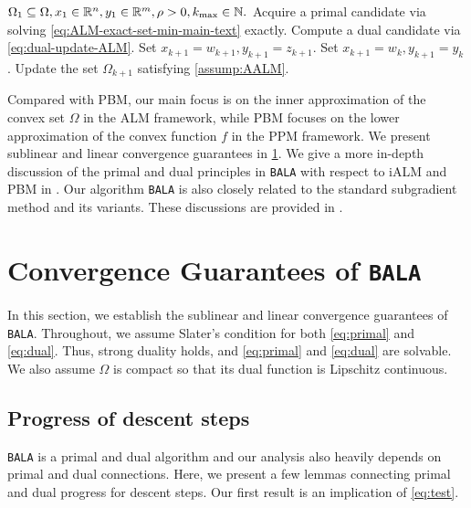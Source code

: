\documentclass[11pt]{article}
\newcommand{\alg}{\texttt{BALA}}%
\begin{document}
\begin{algorithm}[t]
\caption{\underline{B}undle-based \underline{A}ug. \underline{L}agrangian \underline{A}lg. (\alg)
}
\label{alg:bundle-dual}
\begin{algorithmic}[1]
\Require $\Omega_1 \subseteq \Omega, x_1 \in \mathbb{R}^n ,y_1 \in \mathbb{R}^m, \rho  > 0, k_{\max} \in \mathbb{N}.$
    \State Acquire a primal candidate via solving \cref{eq:ALM-exact-set-min-main-text} exactly. 
    \State Compute a dual candidate via \cref{eq:dual-update-ALM}. 
     \State Set $x_{k+1} = w_{k+1}, y_{k+1} = z_{k+1}$.  \hfill {}
    \Else
       \State Set $x_{k+1} = w_{k}, y_{k+1} = y_k$. \hfill  {}
    \EndIf
    \State Update the set $\Omega_{k+1}$ satisfying \cref{assump:AALM}.
\EndFor
\end{algorithmic}
\end{algorithm}
Compared with PBM, our main focus is on the inner approximation of the convex set $\Omega$ in the ALM framework, while PBM focuses on the lower approximation of the convex function $f$ in the PPM framework. 
We present sublinear and linear convergence guarantees in \cref{section:convergence}. We give a more in-depth discussion of the primal and dual principles in \alg{} with respect to iALM and PBM in . Our algorithm \alg{} is also closely related to the standard subgradient method and its variants. These discussions are provided in . 

\section{Convergence Guarantees of \alg} 
\label{section:convergence}
In this section, we establish the sublinear and linear convergence guarantees of \alg. Throughout, we assume Slater's condition for both \eqref{eq:primal} and \eqref{eq:dual}. Thus, strong duality holds, and \eqref{eq:primal} and \eqref{eq:dual} are solvable. We also assume $\Omega$ is compact so that its dual function is Lipschitz continuous. 

\subsection{Progress of descent steps}

\alg{} is a primal and dual algorithm and our analysis also heavily depends on primal and dual connections.  
Here, we present a few lemmas connecting primal and dual progress for descent steps. Our first result is an implication of \cref{eq:test}.
\end{document}
